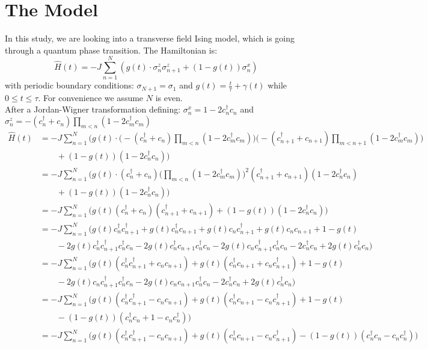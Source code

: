 \documentclass{article}
\begin{document}
\section*{The Model}
In this study, we are looking into a transverse field Ising model, which is going through a quantum phase transition. The Hamiltonian is:
\begin{equation}
    \hat{H}(t)=-J\sum_{n=1}^N \left( g(t) \cdot \sigma_n^z \sigma_{n+1}^z + (1-g(t)) \sigma_n^x \right)
\end{equation}
with periodic boundary conditions: $\sigma_{N+1}=\sigma_1$ and $g(t)=\frac{t}{\tau}+\gamma(t)$ while $0 \leq t \leq \tau$. For convenience we assume $N$ is even.
\\After a Jordan-Wigner transformation defining: $\sigma_n^x=1-2c_n^\dagger c_n$ and $\sigma_n^z=-(c_n^\dagger+c_n) \prod_{m<n} (1-2c_m^\dagger c_m)$
\begin{equation}
    \begin{split}
        \hat{H}(t) & =-J\sum_{n=1}^N \bigg( g(t) \cdot \bigg( -(c_n^\dagger+c_n) \prod_{m<n} (1-2c_m^\dagger c_m) \bigg) \bigg( -(c_{n+1}^\dagger+c_{n+1}) \prod_{m<n+1} (1-2c_m^\dagger c_m) \bigg) \\
        & \qquad + (1-g(t))(1-2c_n^\dagger c_n) \bigg) \\
        & =-J\sum_{n=1}^N \bigg( g(t) \cdot (c_n^\dagger+c_n) \bigg( \prod_{m<n} (1-2c_m^\dagger c_m) \bigg)^2 (c_{n+1}^\dagger+c_{n+1})(1-2c_n^\dagger c_n) \\
        & \qquad + (1-g(t))(1-2c_n^\dagger c_n) \bigg) \\
        & =-J\sum_{n=1}^N \bigg( g(t)(c_n^\dagger+c_n)(c_{n+1}^\dagger+c_{n+1}) + (1-g(t))(1-2c_n^\dagger c_n) \bigg) \\
        & =-J\sum_{n=1}^N \bigg( g(t) c_n^\dagger c_{n+1}^\dagger +g(t) c_n^\dagger c_{n+1}+g(t) c_n c_{n+1}^\dagger +g(t) c_n c_{n+1}+1-g(t) \\
        & \qquad -2g(t) c_n^\dagger c_{n+1}^\dagger c_n^\dagger c_n-2g(t) c_n^\dagger c_{n+1} c_n^\dagger c_n-2g(t) c_n c_{n+1}^\dagger c_n^\dagger c_n-2c_n^\dagger c_n+2g(t) c_n^\dagger c_n \bigg) \\
        & =-J\sum_{n=1}^N \bigg( g(t)(c_n^\dagger c_{n+1}^\dagger+c_n c_{n+1}) +g(t)(c_n^\dagger c_{n+1}+c_n c_{n+1}^\dagger )+1-g(t) \\
        & \qquad -2g(t) c_n c_{n+1}^\dagger c_n^\dagger c_n-2g(t) c_n c_{n+1} c_n^\dagger c_n-2c_n^\dagger c_n+2g(t) c_n^\dagger c_n \bigg) \\
        & =-J\sum_{n=1}^N \bigg( g(t)(c_n^\dagger c_{n+1}^\dagger-c_n c_{n+1}) +g(t)(c_n^\dagger c_{n+1}-c_n c_{n+1}^\dagger )+1-g(t) \\
        & \qquad -(1-g(t))(c_n^\dagger c_n+1-c_n c_n^\dagger ) \bigg) \\
        & =-J\sum_{n=1}^N \bigg( g(t)(c_n^\dagger c_{n+1}^\dagger-c_n c_{n+1}) +g(t)(c_n^\dagger c_{n+1}-c_n c_{n+1}^\dagger )-(1-g(t))(c_n^\dagger c_n-c_n c_n^\dagger ) \bigg)
    \end{split}
\end{equation}
\end{document}
